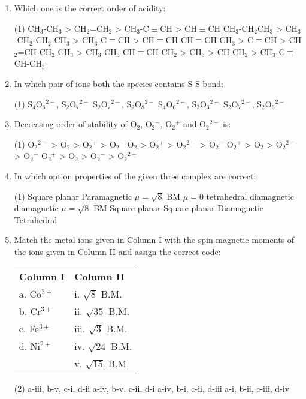 \documentclass[twocolumn]{article}
\begin{document}
\begin{enumerate}
    \item Which one is the correct order of acidity:
    \begin{tasks}(1)
        \task CH$_3$-CH$_3$ > CH$_2$=CH$_2$ > CH$_3$-C$\equiv$CH > CH$\equiv$CH
        \task CH$_3$-CH$_2$CH$_3$ > CH$_3$-CH$_2$-CH$_2$-CH$_3$ > CH$_3$-C$\equiv$CH > CH$\equiv$CH
        \task CH$\equiv$CH-CH$_3$ > C$\equiv$CH > CH$_2$=CH-CH$_2$-CH$_3$ > CH$_3$-CH$_3$
        \task CH$\equiv$CH-CH$_2$ > CH$_3$ > CH-CH$_2$ > CH$_3$-C$\equiv$CH-CH$_3$
    \end{tasks}
    
    \item In which pair of ions both the species contains S-S bond:
    \begin{tasks}(1)
        \task S$_4$O$_6$$^{2-}$, S$_2$O$_7$$^{2-}$
        \task S$_2$O$_7$$^{2-}$, S$_2$O$_8$$^{2-}$
        \task S$_4$O$_6$$^{2-}$, S$_2$O$_3$$^{2-}$
        \task S$_2$O$_7$$^{2-}$, S$_2$O$_6$$^{2-}$
    \end{tasks}
    
    \item Decreasing order of stability of O$_2$, O$_2$$^-$, O$_2$$^+$ and O$_2$$^{2-}$ is:
    \begin{tasks}(1)
        \task O$_2$$^{2-}$ > O$_2$ > O$_2$$^+$ > O$_2$$^-$
        \task O$_2$ > O$_2$$^+$ > O$_2$$^{2-}$ > O$_2$$^-$
        \task O$_2$$^+$ > O$_2$ > O$_2$$^{2-}$ > O$_2$$^-$
        \task O$_2$$^+$ > O$_2$ > O$_2$$^-$ > O$_2$$^{2-}$
    \end{tasks}
    
    \item In which option properties of the given three complex are correct:
    \begin{tasks}(1)
        \task Square planar     Paramagnetic     $\mu = \sqrt{8}$ BM
        \task $\mu = 0$         tetrahedral      diamagnetic
        \task diamagnetic       $\mu = \sqrt{8}$ BM         Square planar
        \task Square planar     Diamagnetic      Tetrahedral
    \end{tasks}
    
    \item Match the metal ions given in Column I with the spin magnetic moments of the ions given in Column II and assign the correct code:
    \begin{tabular}{p{5cm}p{5cm}}
        \textbf{Column I} & \textbf{Column II} \\
        a. Co$^{3+}$  & i. $\sqrt{8}$ B.M. \\
        b. Cr$^{3+}$  & ii. $\sqrt{35}$ B.M. \\
        c. Fe$^{3+}$  & iii. $\sqrt{3}$ B.M. \\
        d. Ni$^{2+}$  & iv. $\sqrt{24}$ B.M. \\
                     & v. $\sqrt{15}$ B.M.
    \end{tabular}
    \begin{tasks}(2)
        \task a-iii, b-v, c-i, d-ii
        \task a-iv, b-v, c-ii, d-i
        \task a-iv, b-i, c-ii, d-iii
        \task a-i, b-ii, c-iii, d-iv
    \end{tasks}
    

\end{enumerate}
\end{document}
